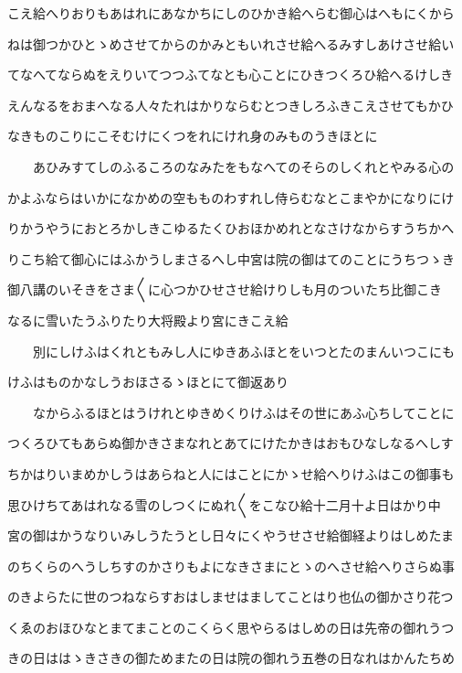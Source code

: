 \documentclass[a4paper,11pt,landscape]{ltjtarticle}
\begin{document}
こえ給へりおりもあはれにあなかちにしのひかき給へらむ御心はへもにくから
\par\medskip
ねは御つかひとゝめさせてからのかみともいれさせ給へるみすしあけさせ給い
\par\medskip
てなへてならぬをえりいてつつふてなとも心ことにひきつくろひ給へるけしき
\par\medskip
えんなるをおまへなる人々たれはかりならむとつきしろふきこえさせてもかひ
\par\medskip
なきものこりにこそむけにくつをれにけれ身のみものうきほとに
\par\medskip
　　あひみすてしのふるころのなみたをもなへてのそらのしくれとやみる心の
\par\medskip
かよふならはいかになかめの空もものわすれし侍らむなとこまやかになりにけ
\par\medskip
りかうやうにおとろかしきこゆるたくひおほかめれとなさけなからすうちかへ
\par\medskip
りこち給て御心にはふかうしまさるへし中宮は院の御はてのことにうちつゝき
\par\medskip
御八講のいそきをさま〱に心つかひせさせ給けりしも月のついたち比御こき
\par\medskip
なるに雪いたうふりたり大将殿より宮にきこえ給
\par\medskip
　　別にしけふはくれともみし人にゆきあふほとをいつとたのまんいつこにも
\par\medskip
けふはものかなしうおほさるゝほとにて御返あり
\par\medskip
　　なからふるほとはうけれとゆきめくりけふはその世にあふ心ちしてことに
\par\medskip
つくろひてもあらぬ御かきさまなれとあてにけたかきはおもひなしなるへしす
\par\medskip
ちかはりいまめかしうはあらねと人にはことにかゝせ給へりけふはこの御事も
\par\medskip
思ひけちてあはれなる雪のしつくにぬれ〱をこなひ給十二月十よ日はかり中
\par\medskip
宮の御はかうなりいみしうたうとし日々にくやうせさせ給御経よりはしめたま
\par\medskip
のちくらのへうしちすのかさりもよになきさまにとゝのへさせ給へりさらぬ事
\par\medskip
のきよらたに世のつねならすおはしませはましてことはり也仏の御かさり花つ
\par\medskip
くゑのおほひなとまてまことのこくらく思やらるはしめの日は先帝の御れうつ
\par\medskip
きの日ははゝきさきの御ためまたの日は院の御れう五巻の日なれはかんたちめ
\end{document}
